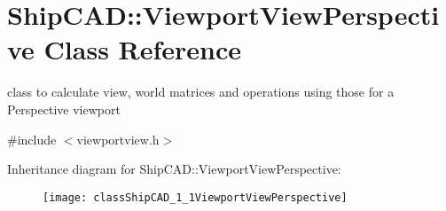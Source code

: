 \hypertarget{classShipCAD_1_1ViewportViewPerspective}{}\section{Ship\+C\+AD\+:\+:Viewport\+View\+Perspective Class Reference}
\label{classShipCAD_1_1ViewportViewPerspective}


class to calculate view, world matrices and operations using those for a Perspective viewport  




{\ttfamily \#include $<$viewportview.\+h$>$}

Inheritance diagram for Ship\+C\+AD\+:\+:Viewport\+View\+Perspective\+:\begin{figure}[H]
\begin{center}
\leavevmode
\texttt{[image: classShipCAD\_1\_1ViewportViewPerspective]}
\end{center}
\end{figure}
